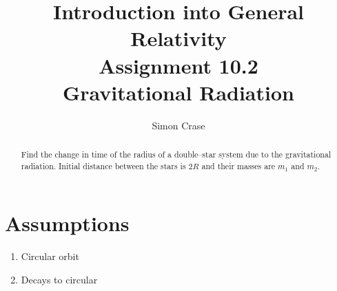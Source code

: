 \documentclass[]{article}
\title{Introduction into General Relativity\\Assignment 10.2\\Gravitational Radiation}
\author{Simon Crase}
\begin{document}
\maketitle
\tableofcontents

\begin{abstract}
Find the change in time of the radius of a double--star system due to the gravitational radiation. Initial distance between the stars is $2R$ and their masses are $m_1$ and $m_2$.

\end{abstract}

\section{Assumptions}
\begin{enumerate}
	\item Circular orbit
	\item Decays to circular
\end{enumerate}
\end{document}
